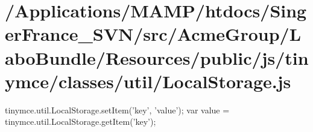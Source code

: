 \hypertarget{_2_applications_2_m_a_m_p_2htdocs_2_singer_france__s_v_n_2src_2_acme_group_2_labo_bundle_2_resoua394efecfcb23b12c7812fc97b92d157}{\section{/\+Applications/\+M\+A\+M\+P/htdocs/\+Singer\+France\+\_\+\+S\+V\+N/src/\+Acme\+Group/\+Labo\+Bundle/\+Resources/public/js/tinymce/classes/util/\+Local\+Storage.\+js}
}
tinymce.\+util.\+Local\+Storage.\+set\+Item('key', 'value'); var value = tinymce.\+util.\+Local\+Storage.\+get\+Item('key');


\begin{DoxyCodeInclude}
\end{DoxyCodeInclude}
 
